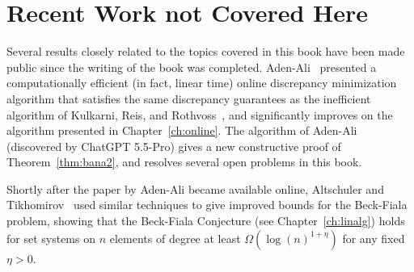 \section{Recent Work not Covered Here}

Several results closely related to the topics covered in this  book have been made public since the writing of the book was completed. Aden-Ali~\cite{adenali2026} presented a computationally efficient (in fact, linear time) online discrepancy minimization algorithm that satisfies the same discrepancy guarantees as the inefficient algorithm of Kulkarni, Reis, and Rothvoss~\cite{rothvoss-online}, and significantly improves on the algorithm presented in Chapter~\ref{ch:online}. The algorithm of Aden-Ali (discovered by ChatGPT 5.5-Pro) gives a new constructive proof of Theorem~\ref{thm:bana2}, and resolves several open problems in this book. 

Shortly after the paper by Aden-Ali became available online, Altschuler and Tikhomirov~\cite{altschulerT2026} used similar techniques to give improved bounds for the Beck-Fiala problem, showing that the Beck-Fiala Conjecture (see Chapter~\ref{ch:linalg}) holds for set systems on $n$ elements of degree at least $\Omega(\log(n)^{1+\eta})$ for any fixed $\eta>0$.



